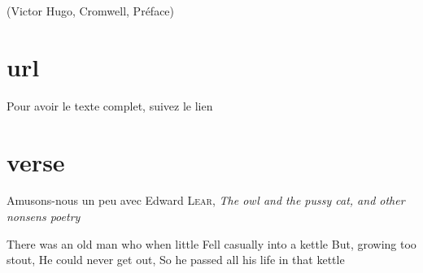 \documentclass{article}
\begin{document}
(Victor Hugo, Cromwell, Préface)

\section{url}
Pour avoir le texte complet, suivez le lien %


\section{verse}

Amusons-nous un peu avec Edward \textsc{Lear}, \emph{The owl and the pussy cat, and other nonsens poetry}

There was an old man who when little
Fell casually into a kettle
	But, growing too stout,
	He could never get out,
So he passed all his life in that kettle
\end{document}
